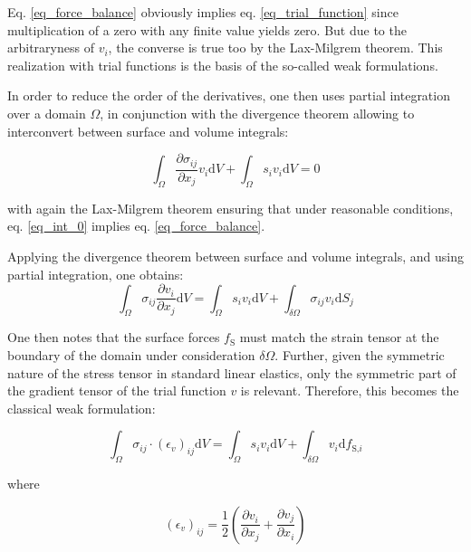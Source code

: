 \documentclass[11pt]{amsart}
\begin{document}
Eq. \ref{eq_force_balance} obviously implies eq. \ref{eq_trial_function} since multiplication of a zero with any finite value yields zero. But due to the arbitraryness of $v_i$, the converse is true too by the Lax-Milgrem theorem\cite{lax_ix_2016}. This realization with trial functions is the basis of the so-called weak formulations\cite{bower_applied_2010}.

In order to reduce the order of the derivatives, one then uses partial integration over a domain $\Omega$, in conjunction with the divergence theorem allowing to interconvert between surface and volume integrals:

\begin{equation}
\int_\Omega \frac{\partial \sigma_{ij}}{\partial x_j}v_i\text{d}V+\int_\Omega s_i v_i \text{d}V=0 \label{eq_int_0}
\end{equation}

with again the Lax-Milgrem theorem\cite{lax_ix_2016} ensuring that under reasonable conditions, eq. \ref{eq_int_0} implies eq. \ref{eq_force_balance}.

Applying the divergence theorem between surface and volume integrals, and using partial integration, one obtains:
\begin{equation}
\int_\Omega \sigma_{ij} \frac{\partial v_i}{\partial x_j} \text{d}V=\int_\Omega s_i v_i \text{d}V+\int_{\delta\Omega} \sigma_{ij}v_i\text{d}S_j 
\end{equation}

One then notes that the surface forces $f_{\text{S}}$ must match the strain tensor at the boundary of the domain under consideration $\delta\Omega$. Further, given the symmetric nature of the stress tensor in standard linear elastics, only the symmetric part of the gradient tensor of the trial function $v$ is relevant. Therefore, this becomes the classical weak formulation\cite{bower_applied_2010}:

\begin{equation}
\int_\Omega \sigma_{ij}\cdot \left(\epsilon_v\right)_{ij}  \text{d}V=\int_\Omega s_i v_i \text{d}V+\int_{\delta\Omega} v_i\text{d}f_{\text{S,}i} \label{eq_variational}
\end{equation}

where

\begin{equation}
\left(\epsilon_v\right)_{ij}=\frac{1}{2}\left(\frac{\partial v_i}{\partial x_j} +\frac{\partial v_j}{\partial x_i}\right) \label{eq_v_deformation_tensor}
\end{equation}
\end{document}
